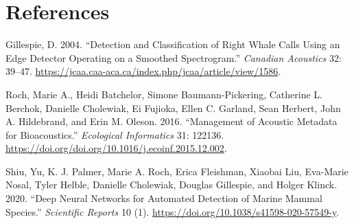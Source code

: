 \documentclass[
]{article}
\newlength{\cslhangindent}
\newenvironment{CSLReferences}[2] %
 {\begin{list}{}{%
  \setlength{\itemindent}{0pt}
  \setlength{\leftmargin}{0pt}
  \setlength{\parsep}{0pt}
  \ifodd #1
   \setlength{\leftmargin}{\cslhangindent}
   \setlength{\itemindent}{-1\cslhangindent}
  \fi
  \setlength{\itemsep}{#2\baselineskip}}}
 {\end{list}}
\begin{document}
\section{References}\label{references}

\label{refs}
\begin{CSLReferences}{1}{0}
Gillespie, D. 2004. {``Detection and Classification of Right Whale Calls
Using an Edge Detector Operating on a Smoothed Spectrogram.''}
\emph{Canadian Acoustics} 32: 39--47.
\url{https://jcaa.caa-aca.ca/index.php/jcaa/article/view/1586}.

Roch, Marie A., Heidi Batchelor, Simone Baumann-Pickering, Catherine L.
Berchok, Danielle Cholewiak, Ei Fujioka, Ellen C. Garland, Sean Herbert,
John A. Hildebrand, and Erin M. Oleson. 2016. {``Management of Acoustic
Metadata for Bioacoustics.''} \emph{Ecological Informatics} 31: 122136.
\url{https://doi.org/doi.org/10.1016/j.ecoinf.2015.12.002}.

Shiu, Yu, K. J. Palmer, Marie A. Roch, Erica Fleishman, Xiaobai Liu,
Eva-Marie Nosal, Tyler Helble, Danielle Cholewiak, Douglas Gillespie,
and Holger Klinck. 2020. {``Deep Neural Networks for Automated Detection
of Marine Mammal Species.''} \emph{Scientific Reports} 10 (1).
\url{https://doi.org/10.1038/s41598-020-57549-y}.

\end{CSLReferences}
\end{document}
